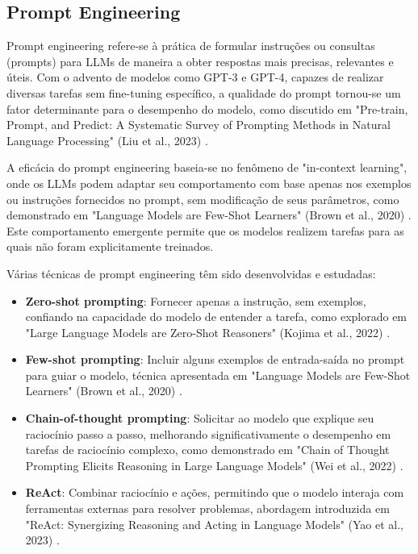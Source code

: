 \documentclass[tcc,capa]{texufpel}
\begin{document}
\subsection{Prompt Engineering}

Prompt engineering refere-se à prática de formular instruções ou consultas (prompts) para LLMs de maneira a obter respostas mais precisas, relevantes e úteis. Com o advento de modelos como GPT-3 e GPT-4, capazes de realizar diversas tarefas sem fine-tuning específico, a qualidade do prompt tornou-se um fator determinante para o desempenho do modelo, como discutido em "Pre-train, Prompt, and Predict: A Systematic Survey of Prompting Methods in Natural Language Processing" (Liu et al., 2023) \cite{liu2023pre}.

A eficácia do prompt engineering baseia-se no fenômeno de "in-context learning", onde os LLMs podem adaptar seu comportamento com base apenas nos exemplos ou instruções fornecidos no prompt, sem modificação de seus parâmetros, como demonstrado em "Language Models are Few-Shot Learners" (Brown et al., 2020) \cite{brown2020language}. Este comportamento emergente permite que os modelos realizem tarefas para as quais não foram explicitamente treinados.

Várias técnicas de prompt engineering têm sido desenvolvidas e estudadas:

\begin{itemize}
    \item \textbf{Zero-shot prompting}: Fornecer apenas a instrução, sem exemplos, confiando na capacidade do modelo de entender a tarefa, como explorado em "Large Language Models are Zero-Shot Reasoners" (Kojima et al., 2022) \cite{kojima2022large}.
    
    \item \textbf{Few-shot prompting}: Incluir alguns exemplos de entrada-saída no prompt para guiar o modelo, técnica apresentada em "Language Models are Few-Shot Learners" (Brown et al., 2020) \cite{brown2020language}.
    
    \item \textbf{Chain-of-thought prompting}: Solicitar ao modelo que explique seu raciocínio passo a passo, melhorando significativamente o desempenho em tarefas de raciocínio complexo, como demonstrado em "Chain of Thought Prompting Elicits Reasoning in Large Language Models" (Wei et al., 2022) \cite{wei2022chain}.
    
    \item \textbf{ReAct}: Combinar raciocínio e ações, permitindo que o modelo interaja com ferramentas externas para resolver problemas, abordagem introduzida em "ReAct: Synergizing Reasoning and Acting in Language Models" (Yao et al., 2023) \cite{yao2023react}.
\end{itemize}
\end{document}
